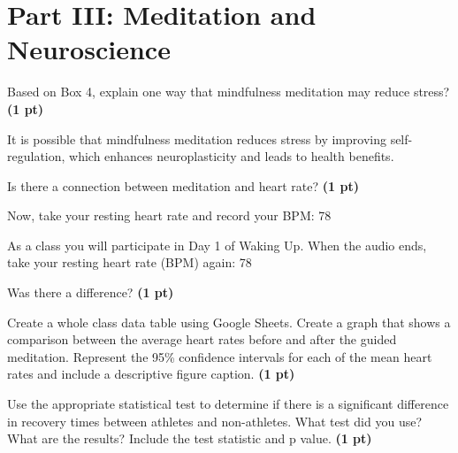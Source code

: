 \documentclass[12pt,a4paper]{article}
\begin{document}
\section*{Part III: Meditation and Neuroscience}
\begin{enumerate}[font=\bfseries, wide, resume]
    {\color{under}\item Based on Box 4, explain one way that mindfulness meditation may reduce stress? \textbf{(1 pt)}}
    
    It is possible that mindfulness meditation reduces stress by improving self-regulation, which enhances neuroplasticity and leads to health benefits.

    {\color{under}\item Is there a connection between meditation and heart rate? \textbf{(1 pt)}}
    
    
    {\color{under}\item Now, take your resting heart rate and record your BPM: {\color{darkmodetext} 78}
    
    As a class you will participate in Day 1 of Waking Up.  When the audio ends, take your resting heart rate (BPM) again: {\color{darkmodetext} 78}

    Was there a difference? \textbf{(1 pt)}}

    
    
    {\color{under}\item Create a whole class data table using Google Sheets. Create a graph that shows a comparison between the average heart rates before and after the guided meditation. Represent the 95\% confidence intervals for each of the mean heart rates and include a descriptive figure caption. \textbf{(1 pt)}}
    
    
    {\color{under}\item Use the appropriate statistical test to determine if there is a significant difference in recovery times between athletes and non-athletes. What test did you use? What are the results? Include the test statistic and p value. \textbf{(1 pt)}}
    
    
\end{enumerate}
\end{document}

